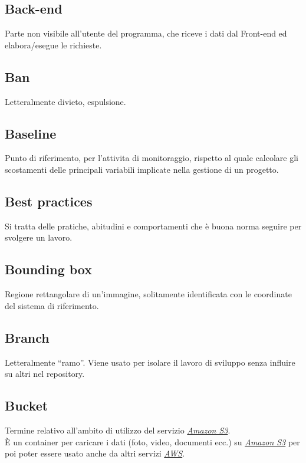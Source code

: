 \documentclass{classes/base}
\begin{document}
    	\subsection*{Back-end}
    	Parte non visibile all'utente del programma, che riceve i dati dal Front-end ed elabora/esegue le richieste.

        \subsection*{Ban}
        Letteralmente divieto, espulsione.

    	\subsection*{Baseline}
    	Punto di riferimento, per l'attivita di monitoraggio, rispetto al quale calcolare gli scostamenti delle principali variabili implicate nella gestione di un progetto.
        
        \subsection*{Best practices} 
        Si tratta delle pratiche, abitudini e comportamenti che è buona norma seguire per svolgere un lavoro.

        \subsection*{Bounding box}
        Regione rettangolare di un'immagine, solitamente identificata con le coordinate del sistema di riferimento.

        \subsection*{Branch} 
        Letteralmente “ramo”. Viene usato per isolare il lavoro di sviluppo senza influire su altri nel repository. 
        
        \subsection*{Bucket}
        Termine relativo all'ambito di utilizzo del servizio \hyperref[sec:S3]{\emph{Amazon S3}}.\\
        È un container per caricare i dati (foto, video, documenti ecc.) su \hyperref[sec:S3]{\emph{Amazon S3}} per poi poter essere usato anche da altri servizi \hyperref[sec:AWS]{\emph{AWS}}. 
        
\end{document}

